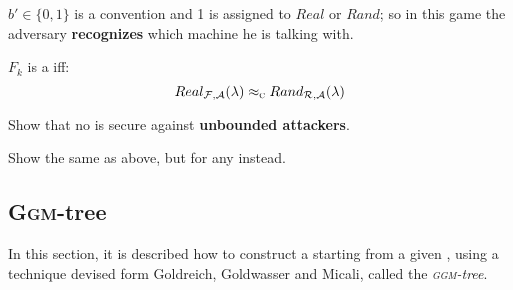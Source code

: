 $b' \in \{0,1\}$ is a convention and 1 is assigned to $Real$ or $Rand$; so in this game the adversary \textbf{recognizes} which machine he is talking with.

\begin{definition}
    $F_k$ is a \prf{} iff: 
    \[
        Real_{\mathcal{F}, \mathcal{A}}(\lambda) \approx_\textsc{c} Rand_{\mathcal{R}, \mathcal{A}}(\lambda)
    \]
\end{definition}

\begin{exercise}
    Show that no \prg{} is secure against \textbf{unbounded attackers}.
\end{exercise}

\begin{exercise}
    Show the same as above, but for any \prf{} instead.
\end{exercise}

\pagebreak

\subsection{\textsc{Ggm}-tree}

In this section, it is described how to construct a \prf{} starting from a given \prg, using a technique devised form Goldreich, Goldwasser and Micali, called the \emph{\textsc{ggm}-tree}.

